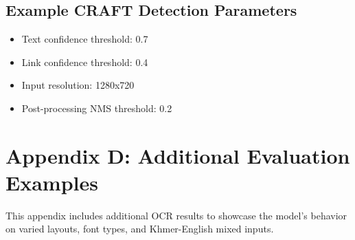 \subsection*{Example CRAFT Detection Parameters}
\begin{itemize}
    \item Text confidence threshold: 0.7
    \item Link confidence threshold: 0.4
    \item Input resolution: 1280x720
    \item Post-processing NMS threshold: 0.2
\end{itemize}

\clearpage
{}
\label{appendix-d}
\section*{Appendix D: Additional Evaluation Examples}
This appendix includes additional OCR results to showcase the model's behavior on varied layouts, font types, and Khmer-English mixed inputs.

